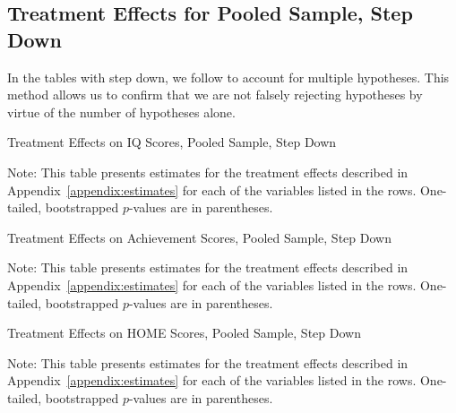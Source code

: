 \subsection{Treatment Effects for Pooled Sample, Step Down}

In the tables with step down, we follow \citet{Romano_Wolf_2005_JASA} to account for multiple hypotheses. This method allows us to confirm that we are not falsely rejecting hypotheses by virtue of the number of hypotheses alone. 


	\begin{table}[H]
     \caption{Treatment Effects on IQ Scores, Pooled Sample, Step Down}
     \label{table:abccare_rslt_pooled_cat0_sd}
	
	\end{table}
\begin{spacing}{1}
\begin{footnotesize}
\noindent Note: This table presents estimates for the treatment effects described in Appendix~\ref{appendix:estimates} for each of the variables listed in the rows.  One-tailed, bootstrapped $p$-values are in parentheses.
\end{footnotesize}
\end{spacing}

	\begin{table}[H]
     \caption{Treatment Effects on Achievement Scores, Pooled Sample, Step Down}
     \label{table:abccare_rslt_pooled_cat1_sd}
	
	\end{table} 
\begin{spacing}{1}
\begin{footnotesize}
\noindent Note: This table presents estimates for the treatment effects described in Appendix~\ref{appendix:estimates} for each of the variables listed in the rows.  One-tailed, bootstrapped $p$-values are in parentheses.
\end{footnotesize}
\end{spacing}

	\begin{table}[H]
     \caption{Treatment Effects on HOME Scores, Pooled Sample, Step Down}
     \label{table:abccare_rslt_pooled_cat2_sd}
	
	\end{table} 
\begin{spacing}{1}
\begin{footnotesize}
\noindent Note: This table presents estimates for the treatment effects described in Appendix~\ref{appendix:estimates} for each of the variables listed in the rows.  One-tailed, bootstrapped $p$-values are in parentheses.
\end{footnotesize}
\end{spacing}

